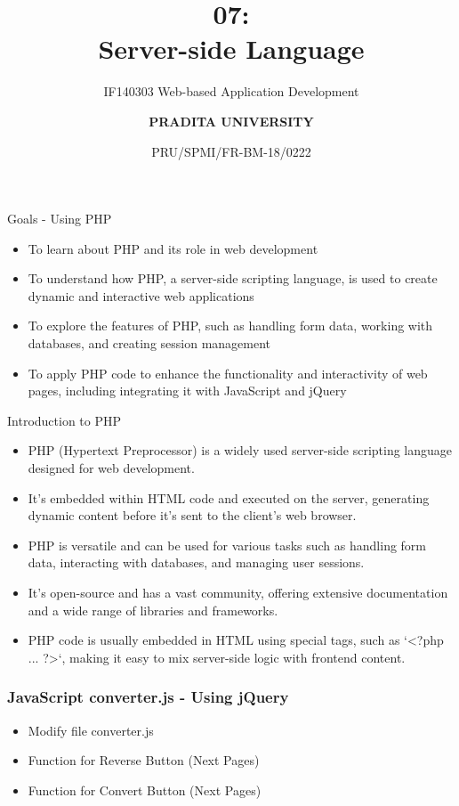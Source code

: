 \documentclass[aspectratio=169, table]{beamer}
\subtitle{IF140303 Web-based Application Development}
\title{\Huge {\textbf{07: \\Server-side Language}}}
\date[Serial]{\scriptsize {PRU/SPMI/FR-BM-18/0222}}
\author[Pradita]{\small {\textbf{PRADITA UNIVERSITY}}}
\begin{document}
\begin{frame}
    \titlepage
\end{frame}

\begin{frame}{Goals - Using PHP}
    \vskip1cm
    \begin{itemize}
        \item To learn about PHP and its role in web development
        \item To understand how PHP, a server-side scripting language, is used to create dynamic and interactive web applications
        \item To explore the features of PHP, such as handling form data, working with databases, and creating session management
        \item To apply PHP code to enhance the functionality and interactivity of web pages, including integrating it with JavaScript and jQuery
    \end{itemize}
\end{frame}


\begin{frame}{Introduction to PHP}
    \vskip0.5cm
    \begin{itemize}
        \item PHP (Hypertext Preprocessor) is a widely used server-side scripting language designed for web development.
        \item It's embedded within HTML code and executed on the server, generating dynamic content before it's sent to the client's web browser.
        \item PHP is versatile and can be used for various tasks such as handling form data, interacting with databases, and managing user sessions.
        \item It's open-source and has a vast community, offering extensive documentation and a wide range of libraries and frameworks.
        \item PHP code is usually embedded in HTML using special tags, such as `<?php ... ?>`, making it easy to mix server-side logic with frontend content.
    \end{itemize}
\end{frame}



\begin{frame}[fragile]
    \frametitle{JavaScript converter.js - Using jQuery}
    \begin{itemize}
        \item Modify file converter.js
        \item Function for Reverse Button (Next Pages)
        \item Function for Convert Button (Next Pages)
    \end{itemize}
\end{frame}
\end{document}

